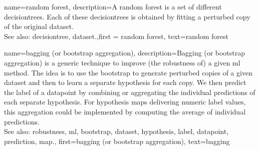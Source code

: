 {name={random forest},
	description={A random forest is a set of different \glspl{decisiontree}. 
		Each of these \glspl{decisiontree} is obtained by fitting a perturbed copy of 
		the original \gls{dataset}.
				\\
		See also: \gls{decisiontree}, \gls{dataset}.},first = {random forest}, text={random forest}
}

{name={bagging (or bootstrap aggregation)},
description={Bagging (or bootstrap aggregation) 
		is a generic technique to improve (the \gls{robustness} of) a given \gls{ml} method. 
		The idea is to use the \gls{bootstrap} to generate perturbed copies of a given \gls{dataset} 
		and then to learn a separate \gls{hypothesis} for each copy. We then predict the 
		\gls{label} of a \gls{datapoint} by combining or aggregating the individual \glspl{prediction} 
		of each separate \gls{hypothesis}. For \gls{hypothesis} \glspl{map} delivering numeric \gls{label} 
		values, this aggregation could be implemented by computing the average of individual 
		\glspl{prediction}.
				\\
		See also: \gls{robustness}, \gls{ml}, \gls{bootstrap}, \gls{dataset}, \gls{hypothesis}, \gls{label}, \gls{datapoint}, \gls{prediction}, \gls{map}.},
		first={bagging (or bootstrap aggregation)},
		text={bagging}}

